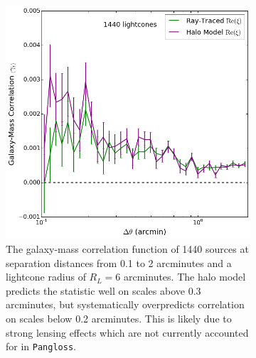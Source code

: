 \documentclass[%
 reprint,
 amsmath,amssymb,
 aps,nofootinbib
]{revtex4-1}
\begin{document}
\begin{figure}
    \centering
    \begin{subfigure}{0.475\textwidth}
        \includegraphics[width=\textwidth]{figs-swe/thesis/ng_corr.png}
        \captionsetup{justification=raggedright,singlelinecheck=false}
        \caption{The galaxy-mass correlation function of 1440 sources at separation distances from 0.1 to 2 arcminutes and a lightcone radius of $R_L=6$ arcminutes. The halo model predicts the statistic well on scales above 0.3 arcminutes, but systematically overpredicts correlation on scales below 0.2 arcminutes. This is likely due to strong lensing effects which are not currently accounted for in \texttt{Pangloss}.}
        \label{fig:ng_corr}
    \end{subfigure}
    ~~
    \begin{subfigure}{0.475\textwidth}

\end{subfigure}
\end{figure}
\end{document}
